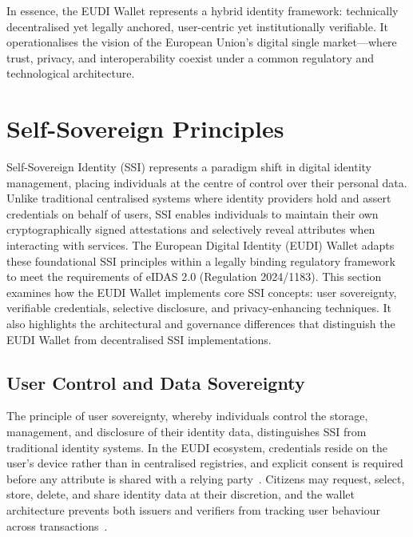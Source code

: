 \documentclass[sigconf,balance,nonacm,authordraft]{acmart}
\begin{document}
In essence, the EUDI Wallet represents a hybrid identity framework: technically decentralised yet legally anchored, user-centric yet institutionally verifiable. It operationalises the vision of the European Union’s digital single market—where trust, privacy, and interoperability coexist under a common regulatory and technological architecture.

\section{Self-Sovereign Principles}
\label{sec:ssi}

Self-Sovereign Identity (SSI) represents a paradigm shift in digital identity management, placing individuals at the centre of control over their personal data. Unlike traditional centralised systems where identity providers hold and assert credentials on behalf of users, SSI enables individuals to maintain their own cryptographically signed attestations and selectively reveal attributes when interacting with services. The European Digital Identity (EUDI) Wallet adapts these foundational SSI principles within a legally binding regulatory framework to meet the requirements of eIDAS 2.0 (Regulation 2024/1183). This section examines how the EUDI Wallet implements core SSI concepts: user sovereignty, verifiable credentials, selective disclosure, and privacy-enhancing techniques. It also highlights the architectural and governance differences that distinguish the EUDI Wallet from decentralised SSI implementations.

\subsection{User Control and Data Sovereignty}

The principle of user sovereignty, whereby individuals control the storage, management, and disclosure of their identity data, distinguishes SSI from traditional identity systems. In the EUDI ecosystem, credentials reside on the user's device rather than in centralised registries, and explicit consent is required before any attribute is shared with a relying party~\cite{ZKPDiscussion_Recital15,ZKPDiscussion_Article5a}. Citizens may request, select, store, delete, and share identity data at their discretion, and the wallet architecture prevents both issuers and verifiers from tracking user behaviour across transactions~\cite{ZKPDiscussion_Article5a}. 
\end{document}
